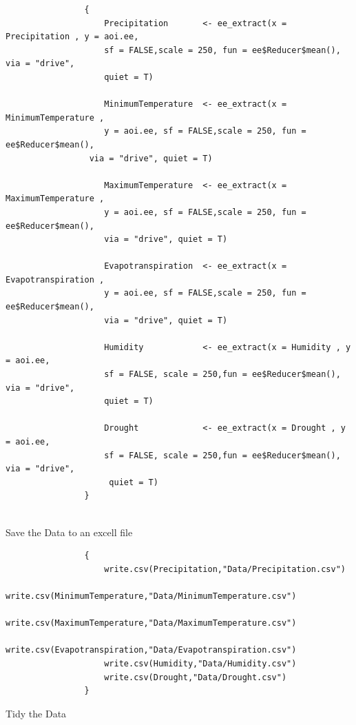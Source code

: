 \documentclass[12pt,a4paper]{book}
\begin{document}
        \begin{shaded}
        	\begin{verbatim}
        		{
        			Precipitation       <- ee_extract(x = Precipitation , y = aoi.ee,
        			sf = FALSE,scale = 250, fun = ee$Reducer$mean(), via = "drive",
        			quiet = T)
        			
        			MinimumTemperature  <- ee_extract(x = MinimumTemperature , 
        			y = aoi.ee, sf = FALSE,scale = 250, fun = ee$Reducer$mean(),
        		 via = "drive", quiet = T)
        			
        			MaximumTemperature  <- ee_extract(x = MaximumTemperature ,
        			y = aoi.ee, sf = FALSE,scale = 250, fun = ee$Reducer$mean(),
        			via = "drive", quiet = T)
        			
        			Evapotranspiration  <- ee_extract(x = Evapotranspiration ,
        			y = aoi.ee, sf = FALSE,scale = 250, fun = ee$Reducer$mean(),
        			via = "drive", quiet = T)
        			
        			Humidity            <- ee_extract(x = Humidity , y = aoi.ee,
        			sf = FALSE, scale = 250,fun = ee$Reducer$mean(), via = "drive",
        			quiet = T)
        			
        			Drought             <- ee_extract(x = Drought , y = aoi.ee, 
        			sf = FALSE, scale = 250,fun = ee$Reducer$mean(), via = "drive",
        			 quiet = T)
        		}
        		
        	\end{verbatim}
        \end{shaded}
    Save the Data to an excell file 
		\begin{shaded}
			\begin{verbatim}
				{
					write.csv(Precipitation,"Data/Precipitation.csv")
					write.csv(MinimumTemperature,"Data/MinimumTemperature.csv")
					write.csv(MaximumTemperature,"Data/MaximumTemperature.csv")
					write.csv(Evapotranspiration,"Data/Evapotranspiration.csv")
					write.csv(Humidity,"Data/Humidity.csv")
					write.csv(Drought,"Data/Drought.csv")
				}
			\end{verbatim}
		\end{shaded}
		Tidy the Data
\end{document}
